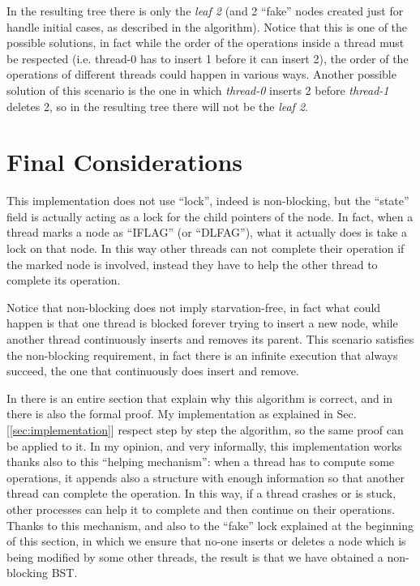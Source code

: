 \documentclass[a4paper]{article}
\begin{document}
In the resulting tree there is only the \emph{leaf 2} (and 2 ``fake'' nodes created just for handle initial cases, as described in the algorithm). Notice that this is one of the possible solutions, in fact while the order of the operations inside a thread must be respected (i.e. thread-0 has to insert 1 before it can insert 2), the order of the operations of different threads could happen in various ways. Another possible solution of this scenario is the one in which \emph{thread-0} inserts 2 before \emph{thread-1} deletes 2, so in the resulting tree there will not be the \emph{leaf 2}.


\section{Final Considerations}
\label{sec:final_considerations}

This implementation does not use ``lock'', indeed is non-blocking, but the ``state'' field is actually acting as a lock for the child pointers of the node. In fact, when a thread marks a node as ``IFLAG'' (or ``DLFAG''), what it actually does is take a lock on that node. In this way other threads can not complete their operation if the marked node is involved, instead they have to help the other thread to complete its operation.

Notice that non-blocking does not imply starvation-free, in fact what could happen is that one thread is blocked forever trying to insert a new node, while another thread continuously inserts and removes its parent. This scenario satisfies the non-blocking requirement, in fact there is an infinite execution that always succeed, the one that continuously does insert and remove.

In \cite{algorithm} there is an entire section that explain why this algorithm is correct, and in \cite{proof} there is also the formal proof. My implementation as explained in Sec.[\ref{sec:implementation}] respect step by step the algorithm, so the same proof can be applied to it. In my opinion, and very informally, this implementation works thanks also to this ``helping mechanism'': when a thread has to compute some operations, it appends also a structure with enough information so that another thread can complete the operation. In this way, if a thread crashes or is stuck, other processes can help it to complete and then continue on their operations. Thanks to this mechanism, and also to the ``fake'' lock explained at the beginning of this section, in which we ensure that no-one inserts or deletes a node which is being modified by some other threads, the result is that we have obtained a non-blocking \ac{BST}.
\end{document}
